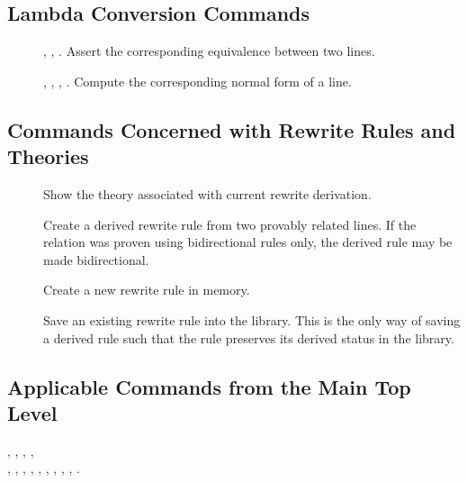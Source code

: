 \subsection{Lambda Conversion Commands}
  \begin{description}
  \item[] , ,
    . Assert the corresponding equivalence between two
    lines.
  \item[] , ,
    , . Compute the
    corresponding normal form of a line.
  \end{description}

\subsection{Commands Concerned with Rewrite Rules and Theories}
  \begin{description}
  \item[]  Show the theory associated with current
    rewrite derivation.
  \item[]  Create a derived rewrite rule from two
    provably related lines. If the relation was proven using bidirectional
    rules only, the derived rule may be made bidirectional.
  \item[]  Create a new rewrite rule in memory.
  \item[]  Save an existing rewrite rule into the
    library. This is the only way of saving a derived rule such that the rule
    preserves its derived status in the library.
  \end{description}

\subsection{Applicable Commands from the Main Top Level}
, ,
, ,\\
, ,
, ,
, ,
, , ,
.\smallskip

